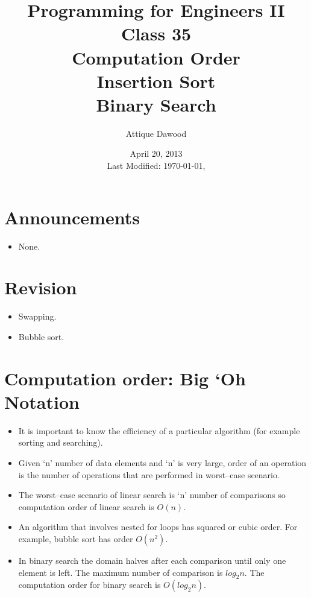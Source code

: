\documentclass[12pt,a4paper]{article}
\title{\vspace{-2cm}Programming for Engineers II\\Class 35\\Computation Order\\Insertion Sort\\Binary Search}
\author{Attique Dawood}
\date{April 20, 2013\\[0.2cm] Last Modified: \today, \currenttime}
\begin{document}
\maketitle
\section{Announcements}
\begin{itemize}
\item None.
\end{itemize}
\section{Revision}
\begin{itemize}
\item Swapping.
\item Bubble sort.
\end{itemize}
\section{Computation order: Big `Oh Notation}
\begin{itemize}
\item It is important to know the efficiency of a particular algorithm (for example sorting and searching).
\item Given `n' number of data elements and `n' is very large, order of an operation is the number of operations that are performed in worst--case scenario.
\item The worst--case scenario of linear search is `n' number of comparisons so computation order of linear search is $O(n)$.
\item An algorithm that involves nested for loops has squared or cubic order. For example, bubble sort has order $O(n^2)$.
\item In binary search the domain halves after each comparison until only one element is left. The maximum number of comparison is $log_2n$. The computation order for binary search is $O(log_2n)$.
\end{itemize}
\end{document}
